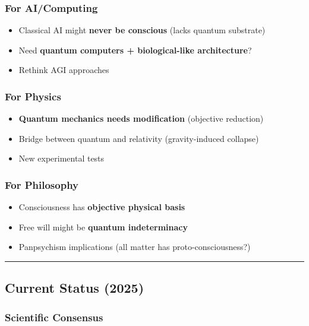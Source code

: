 \subsubsection{For AI/Computing}\label{for-aicomputing}

\begin{itemize}
\tightlist
\item
  Classical AI might \textbf{never be conscious} (lacks quantum
  substrate)
\item
  Need \textbf{quantum computers + biological-like architecture}?
\item
  Rethink AGI approaches
\end{itemize}

\subsubsection{For Physics}\label{for-physics}

\begin{itemize}
\tightlist
\item
  \textbf{Quantum mechanics needs modification} (objective reduction)
\item
  Bridge between quantum and relativity (gravity-induced collapse)
\item
  New experimental tests
\end{itemize}

\subsubsection{For Philosophy}\label{for-philosophy}

\begin{itemize}
\tightlist
\item
  Consciousness has \textbf{objective physical basis}
\item
  Free will might be \textbf{quantum indeterminacy}
\item
  Panpsychism implications (all matter has proto-consciousness?)
\end{itemize}

\begin{center}\rule{0.5\linewidth}{0.5pt}\end{center}

\subsection{Current Status (2025)}\label{current-status-2025}

\subsubsection{Scientific Consensus}\label{scientific-consensus}

